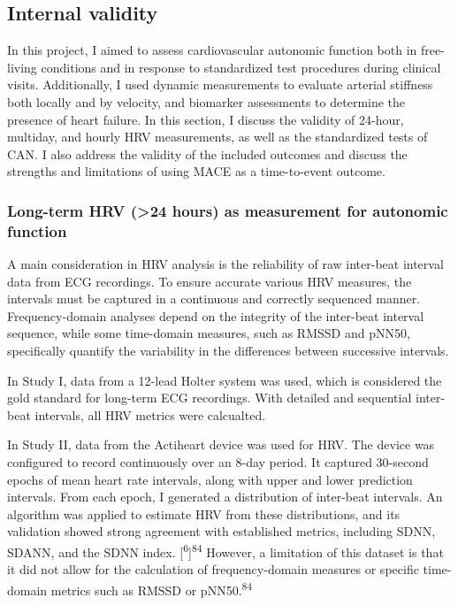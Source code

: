 \documentclass[
  letterpaper,
  headsepline=true,
  open=any]{scrbook}
\begin{document}
\hypertarget{internal-validity}{%
\subsection{Internal validity}\label{internal-validity}}

In this project, I aimed to assess cardiovascular autonomic function
both in free-living conditions and in response to standardized test
procedures during clinical visits. Additionally, I used dynamic
measurements to evaluate arterial stiffness both locally and by
velocity, and biomarker assessments to determine the presence of heart
failure. In this section, I discuss the validity of 24-hour, multiday,
and hourly HRV measurements, as well as the standardized tests of CAN. I
also address the validity of the included outcomes and discuss the
strengths and limitations of using MACE as a time-to-event outcome.

\hypertarget{long-term-hrv-24-hours-as-measurement-for-autonomic-function}{%
\subsubsection{Long-term HRV (\textgreater24 hours) as measurement for
autonomic
function}\label{long-term-hrv-24-hours-as-measurement-for-autonomic-function}}

A main consideration in HRV analysis is the reliability of raw
inter-beat interval data from ECG recordings. To ensure accurate various
HRV measures, the intervals must be captured in a continuous and
correctly sequenced manner. Frequency-domain analyses depend on the
integrity of the inter-beat interval sequence, while some time-domain
measures, such as RMSSD and pNN50, specifically quantify the variability
in the differences between successive intervals.

In Study I, data from a 12-lead Holter system was used, which is
considered the gold standard for long-term ECG recordings. With detailed
and sequential inter-beat intervals, all HRV metrics were calcualted.

In Study II, data from the Actiheart device was used for HRV. The device
was configured to record continuously over an 8-day period. It captured
30-second epochs of mean heart rate intervals, along with upper and
lower prediction intervals. From each epoch, I generated a distribution
of inter-beat intervals. An algorithm was applied to estimate HRV from
these distributions, and its validation showed strong agreement with
established metrics, including SDNN, SDANN, and the SDNN index.
{[}\textsuperscript{6}{]}\textsuperscript{84} However, a limitation of
this dataset is that it did not allow for the calculation of
frequency-domain measures or specific time-domain metrics such as RMSSD
or pNN50.\textsuperscript{84}
\end{document}
